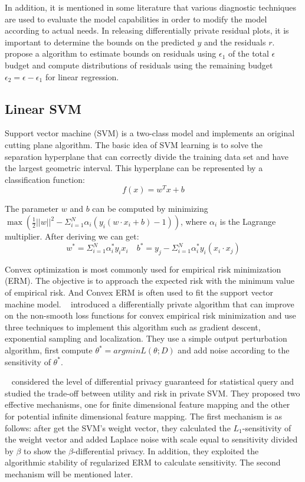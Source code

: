 \documentclass[draftclsnofoot,onecolumn,twoside]{IEEEtran}
\begin{document}
In addition, it is mentioned in some literature that various diagnostic techniques are used to evaluate the model capabilities in order to modify the model according to actual needs. In releasing differentially private residual plots, it is important to determine the bounds on the predicted $y$ and the residuals $r$. ~\cite{Yan2017Differentially} propose a algorithm to estimate bounds on residuals using $\epsilon_1$ of the total $\epsilon$ budget and compute distributions of residuals using the remaining budget $\epsilon_2 = \epsilon - \epsilon_1$ for linear regression.

\subsection{Linear SVM}
Support vector machine (SVM) is a two-class model and implements an original cutting plane algorithm. The basic idea of SVM learning is to solve the separation hyperplane that can correctly divide the training data set and have the largest geometric interval. This hyperplane can be represented by a classification function:
\begin{equation}
f(x)=w^{T}x + b
\end{equation}

The parameter $w$ and $b$ can be computed by minimizing $\max(\frac{1}{2}||w||^{2} - \Sigma_{i=1}^N\alpha_{i}(y_{i}(w \cdot x_{i} + b) - 1))$, where $\alpha _i$ is the Lagrange multiplier. After deriving we can get:
\begin{equation}
w^* = \Sigma_{i=1}^N\alpha_{i}^*y_{i}x_{i}
\quad b^* = y_j - \Sigma_{i=1}^N\alpha_{i}^*y_{i}(x_i \cdot x_j)
\end{equation}

Convex optimization is most commonly used for empirical risk minimization (ERM). The objective is to approach the expected risk with the minimum value of empirical risk. And Convex ERM is often used to fit the support vector machine model. ~\cite{Bassily2014Differentially} introduced a differentially private algorithm that can improve on the non-smooth loss functions for convex empirical risk minimization and use three techniques to implement this algorithm such as gradient descent, exponential sampling and localization. They use a simple output perturbation algorithm, first compute $\theta^* = argminL(\theta ; D)$ and add noise according to the sensitivity of $\theta^*$.

~\cite{Rubinstein2009Learning} considered the level of differential privacy guaranteed for statistical query and studied the trade-off between utility and risk in private SVM. They proposed two effective mechanisms, one for finite dimensional feature mapping and the other for potential infinite dimensional feature mapping. The first mechanism is as follows: after get the SVM's weight vector, they calculated the $L_1$-sensitivity of the weight vector and added Laplace noise with scale equal to sensitivity divided by $\beta$ to show the $\beta$-differential privacy. In addition, they exploited the algorithmic stability of regularized ERM to calculate sensitivity. The second mechanism will be mentioned later.
\end{document}
